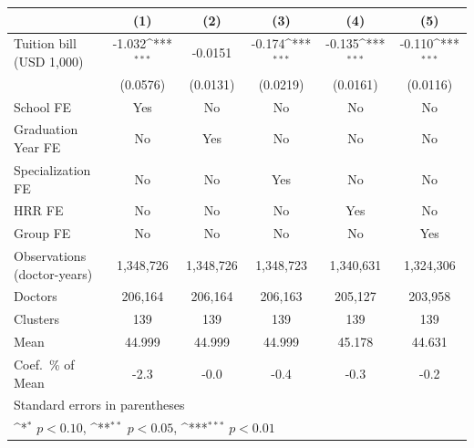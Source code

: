 {
\def\sym#1{\ifmmode^{#1}\else\(^{#1}\)\fi}
\begin{tabular}{l*{5}{c}}
\hline\hline
                    &\multicolumn{1}{c}{(1)}         &\multicolumn{1}{c}{(2)}         &\multicolumn{1}{c}{(3)}         &\multicolumn{1}{c}{(4)}         &\multicolumn{1}{c}{(5)}         \\
\hline
Tuition bill (USD 1,000)&      -1.032\sym{***}&     -0.0151         &      -0.174\sym{***}&      -0.135\sym{***}&      -0.110\sym{***}\\
                    &    (0.0576)         &    (0.0131)         &    (0.0219)         &    (0.0161)         &    (0.0116)         \\
[1em]
School FE           &         Yes         &          No         &          No         &          No         &          No         \\
[1em]
Graduation Year FE  &          No         &         Yes         &          No         &          No         &          No         \\
[1em]
Specialization FE   &          No         &          No         &         Yes         &          No         &          No         \\
[1em]
HRR FE              &          No         &          No         &          No         &         Yes         &          No         \\
[1em]
Group FE            &          No         &          No         &          No         &          No         &         Yes         \\
\hline
Observations (doctor-years)&   1,348,726         &   1,348,726         &   1,348,723         &   1,340,631         &   1,324,306         \\
Doctors             &     206,164         &     206,164         &     206,163         &     205,127         &     203,958         \\
Clusters            &         139         &         139         &         139         &         139         &         139         \\
Mean                &      44.999         &      44.999         &      44.999         &      45.178         &      44.631         \\
Coef.\ \% of Mean   &        -2.3         &        -0.0         &        -0.4         &        -0.3         &        -0.2         \\
\hline\hline
\multicolumn{6}{l}{\footnotesize Standard errors in parentheses}\\
\multicolumn{6}{l}{\footnotesize \sym{*} \(p<0.10\), \sym{**} \(p<0.05\), \sym{***} \(p<0.01\)}\\
\end{tabular}
}
